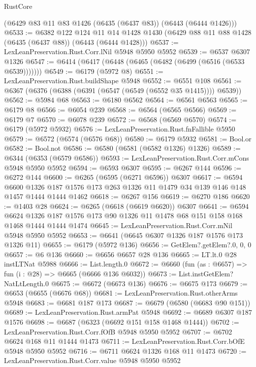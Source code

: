 \begin{lexlean}{RustCore}
\begin{coremodule}
{\begin{coremodule}
{{{{{{{{{{{{{{{{{{{{{{{{{{{{{{{{{{{{{{{{{{{{{    (@6429 @83 @11 @83 @1426 (@6435 (@6437 @83)) (@6443 (@6444 @1426)))
@6533 := @6382
    @122
    @124
    @11
    @14
    @1428
    @1430
    (@6429 @88 @11 @88 @1428 (@6435 (@6437 @88)) (@6443 (@6444 @1428)))
@6537 := LexLeanPreservation.Rust.Corr.lNil @5948 @5950 @5952
@6539 := @6537 @6307 @1326
@6547 := @6414 (@6417 (@6448 (@6465 (@6482 (@6499 (@6516 (@6533 @6539)))))))
@6549 := @6179 (@5972 @8)
@6551 := LexLeanPreservation.Rust.buildShape @5948
@6552 := @6551 @108
@6561 := @6367 (@6376 (@6388 (@6391 (@6547 (@6549 (@6552 @35 @1415)))) @6539))
@6562 := @5984 @68
@6563 := @6180 @6562
@6564 := @6561 @6563
@6565 := @6179 @8
@6566 := @6054 @239
@6568 := @6564 (@6565 @6566)
@6569 := @6179 @7
@6570 := @6078 @239
@6572 := @6568 (@6569 @6570)
@6574 := @6179 (@5972 @5932)
@6576 := LexLeanPreservation.Rust.fnFallible @5950
@6579 := @6572 (@6574 (@6576 @68))
@6580 := @6179 @5932
@6581 := Bool.or
@6582 := Bool.not
@6586 := @6580 (@6581 (@6582 @1326) @1326)
@6589 := @6344 (@6353 (@6579 @6586))
@6593 := LexLeanPreservation.Rust.Corr.mCons @5948 @5950 @5952
@6594 := @6593 @6307
@6595 := @6267 @144
@6596 := @6272 @144
@6600 := @6265 (@6595 (@6271 @6596)) @6307
@6617 := @6594
    @6600
    @1326
    @187
    @1576
    @173
    @263
    @1326
    @11
    @1479
    @34
    @139
    @146
    @148
    @1457
    @1444
    @1444
    @1462
@6618 := @6267 @156
@6619 := @6270 @186
@6620 := @1403 @28
@6624 := @6265 (@6618 (@6619 @6620)) @6307
@6641 := @6594
    @6624
    @1326
    @187
    @1576
    @173
    @90
    @1326
    @11
    @1478
    @68
    @151
    @158
    @168
    @1468
    @1444
    @1444
    @1474
@6645 := LexLeanPreservation.Rust.Corr.mNil @5948 @5950 @5952
@6653 := @6641 (@6645 @6307 @1326 @187 @1576 @173 @1326 @11)
@6655 := @6179 (@5972 @136)
@6656 := GetElem?.getElem?.{0, 0, 0}
@6657 := @6 @136
@6660 := @6656 @6657 @28 @136
@6665 := LT.lt.{0} @28 instLTNat @5988
@6666 := List.length.{0}
@6672 := @6660 (fun (as : @6657) => fun (i : @28) => @6665 (@6666 @136 @6032))
@6673 := List.instGetElem?NatLtLength.{0}
@6675 := @6672 (@6673 @136)
@6676 := @6675 @173
@6679 := @6653 (@6655 (@6676 @68))
@6681 := LexLeanPreservation.Rust.otherArms @5948
@6683 := @6681 @187 @173
@6687 := @6679 (@6580 (@6683 @90 @151))
@6689 := LexLeanPreservation.Rust.armPat @5948
@6692 := @6689 @6307 @187 @1576
@6698 := @6687 (@6323 (@6692 @151 @158 @1468 @1444))
@6702 := LexLeanPreservation.Rust.Corr.fOfB @5948 @5950 @5952
@6707 := @6702 @6624 @168 @11 @1444 @1473
@6711 := LexLeanPreservation.Rust.Corr.bOfE @5948 @5950 @5952
@6716 := @6711 @6624 @1326 @168 @11 @1473
@6720 := LexLeanPreservation.Rust.Corr.value @5948 @5950 @5952
}}}}}}}}}}}}}}}}}}}}}}}}}}}}}}}}}}}}}}}}}}}}}
\end{coremodule}}
\end{coremodule}
\end{lexlean}
